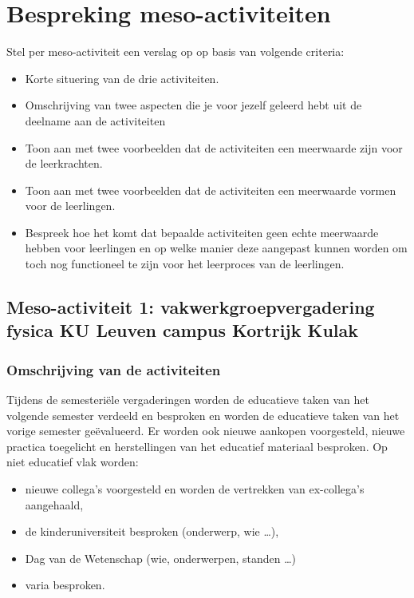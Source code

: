 \documentclass[a4paper,12pt,twoside]{article}%
\begin{document}
	\section{Bespreking meso-activiteiten}
	Stel per meso-activiteit een verslag op op basis van volgende criteria:
	\begin{itemize}
		\item Korte situering van de drie activiteiten.
		\item Omschrijving van twee aspecten die je voor jezelf geleerd hebt uit de deelname aan de activiteiten
		\item  Toon aan met twee voorbeelden dat de activiteiten een meerwaarde zijn voor de leerkrachten.
		\item Toon aan met twee voorbeelden dat de activiteiten een meerwaarde vormen voor de leerlingen.
		\item Bespreek hoe het komt dat bepaalde activiteiten geen echte meerwaarde hebben voor leerlingen en op welke manier deze aangepast kunnen worden om toch nog functioneel te zijn voor het leerproces van de leerlingen.
	\end{itemize}

	\subsection{Meso-activiteit 1: vakwerkgroepvergadering fysica KU Leuven campus Kortrijk Kulak}
	\subsubsection{Omschrijving van de activiteiten}
	Tijdens de semesteriële vergaderingen worden de educatieve taken van het volgende semester verdeeld en besproken en worden de educatieve taken van het vorige semester geëvalueerd. Er worden ook nieuwe aankopen voorgesteld, nieuwe practica toegelicht en herstellingen van het educatief materiaal besproken. Op niet educatief vlak worden:
	\begin{itemize}
		\item nieuwe collega's voorgesteld en worden de vertrekken van ex-collega's aangehaald,
		\item de kinderuniversiteit besproken (onderwerp, wie \ldots),
		\item Dag van de Wetenschap (wie, onderwerpen, standen \ldots)
		\item varia besproken.
	\end{itemize}  
	
\end{document}
